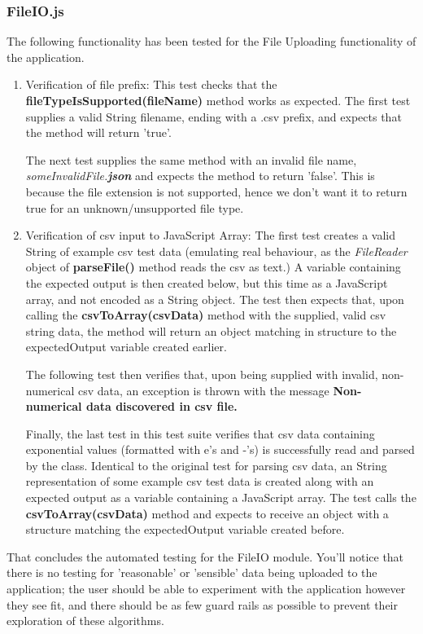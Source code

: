 \subsubsection{FileIO.js}
The following functionality has been tested for the File Uploading functionality of the application. 

\begin{enumerate}
    \item Verification of file prefix: This test checks that the {\bf fileTypeIsSupported(fileName)} method works as expected. The first test supplies a valid String filename, ending with a .csv prefix, and expects that the method will return 'true'.
    
    The next test supplies the same method with an invalid file name, {\it someInvalidFile.{\bf json}} and expects the method to return 'false'. This is because the file extension is not supported, hence we don't want it to return true for an unknown/unsupported file type.
    \item Verification of csv input to JavaScript Array: The first test creates a valid String of example csv test data (emulating real behaviour, as the {\it FileReader} object of {\bf parseFile()} method reads the csv as text.) A variable containing the expected output is then created below, but this time as a JavaScript array, and not encoded as a String object. The test then expects that, upon calling the {\bf csvToArray(csvData)} method with the supplied, valid csv string data, the method will return an object matching in structure to the expectedOutput variable created earlier.
    
    The following test then verifies that, upon being supplied with invalid, non-numerical csv data, an exception is thrown with the message {\bf Non-numerical data discovered in csv file.}
    
    Finally, the last test in this test suite verifies that csv data containing exponential values (formatted with e's and -'s) is successfully read and parsed by the class. Identical to the original test for parsing csv data, an String representation of some example csv test data is created along with an expected output as a variable containing a JavaScript array. The test calls the {\bf csvToArray(csvData)} method and expects to receive an object with a structure matching the expectedOutput variable created before.
\end{enumerate}

That concludes the automated testing for the FileIO module. You'll notice that there is no testing for 'reasonable' or 'sensible' data being uploaded to the application; the user should be able to experiment with the application however they see fit, and there should be as few guard rails as possible to prevent their exploration of these algorithms. 

